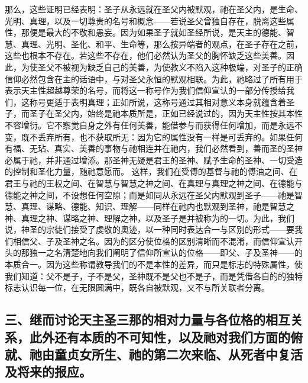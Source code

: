 那么，这些证明已经表明：圣子从永远就在圣父内被默观，祂在圣父内，是生命、光明、真理，以及一切尊贵的名号和概念——若说圣父曾独自存在，脱离这些属性，那便是最大的不敬和愚妄。因为如果圣子就如圣经所说，是天主的德能、智慧、真理、光明、圣化、和平、生命等，那么按异端者的观点，在圣子存在之前，这些也根本不存在。若这些不存在，他们必然认为圣父的胸怀缺乏这些美善。因此，为使圣父不被视为缺乏自己的美善，为使教义不陷入这种极端，对圣子的正确信仰必然包含在主的话语中，与对圣父永恒的默观相联。为此，祂略过了所有用于表示天主性超越尊荣的名号，而将这一称号作为我们信仰宣认的一部分传授给我们，这称号更适于表明真理；正如所说，这称号通过其相对意义本身就蕴含着圣子，而圣子在圣父内，始终是祂本质所是，正如已经说过的，因为天主性按其本性不容增衍。它不察觉自身之外有任何美善，能借参与而获得任何增加，而是永远不变，既不丢弃所有，也不获取所无：因为它的属性没有一样是可丢弃的。如果任何有福、无玷、真实、美善的事物与祂相连并在祂内，我们必然看到，善而圣的圣神必属于祂，并非通过增添。那圣神无疑是君王的圣神、赋予生命的圣神、一切受造的控制和圣化力量，随祂意愿而。 这样，我们在受傅的基督与祂的傅油之间、在君王与祂的王权之间、在智慧与智慧之神之间、在真理与真理之神之间、在德能与德能之神之间，不设想任何空隙；而是如同从永远在圣父内默观到圣子——祂是智慧、真理、谋略、德能、知识、理解——同样在祂内也默观到圣神，祂是智慧之神、真理之神、谋略之神、理解之神，以及圣子是并被称为的一切。为此，我们说，神圣的宗徒们接受了虔敬的奥迹，以一种同时表达合一与区别的形式——要我们相信父、子及圣神之名。因为的区分使位格的区别清晰而不混淆，而信仰宣认开头的那独一之名清楚地向我们阐明了信仰所宣认的位格——即父、子及圣神——的本质合一。因为这些称谓教导我们的不是本性的差异，而只是标志的特殊属性，使我们知道：父不是子，子不是父，圣神既不是父也不是子，而是凭借各自的的独特标志认识每一位，在无限圆满中，既各自被默观，又不与所关联者分离。\par


\subsection{三、继而讨论天主圣三那的相对力量与各位格的相互关系，此外还有本质的不可知性，以及祂对我们方面的俯就、祂由童贞女所生、祂的第二次来临、从死者中复活及将来的报应。}

